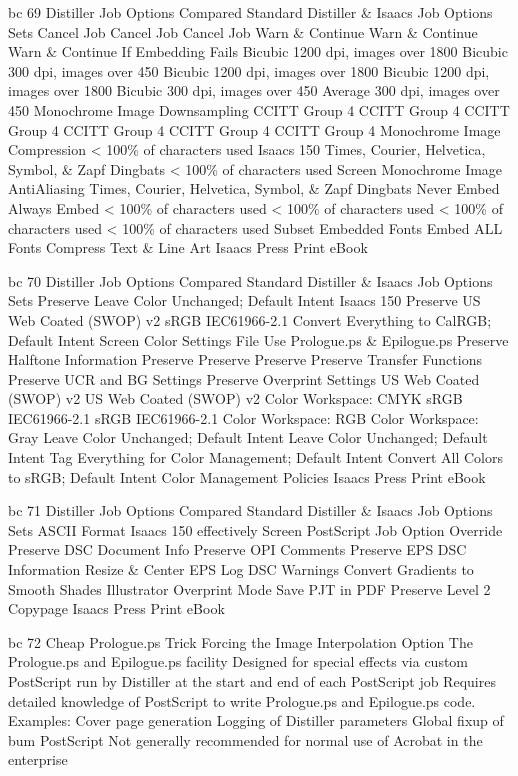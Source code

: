 \documentclass[11pt,a4paper]{article}
\begin{document}
bc 69 Distiller Job Options Compared Standard Distiller \& Isaacs Job Options Sets Cancel Job Cancel Job Cancel Job Warn \& Continue Warn \& Continue Warn \& Continue If Embedding Fails Bicubic 1200 dpi, images over 1800 Bicubic 300 dpi, images over 450 Bicubic 1200 dpi, images over 1800 Bicubic 1200 dpi, images over 1800 Bicubic 300 dpi, images over 450 Average 300 dpi, images over 450 Monochrome Image Downsampling CCITT Group 4 CCITT Group 4 CCITT Group 4 CCITT Group 4 CCITT Group 4 CCITT Group 4 Monochrome Image Compression < 100\% of characters used Isaacs 150 Times, Courier, Helvetica, Symbol, \& Zapf Dingbats < 100\% of characters used Screen Monochrome Image AntiAliasing Times, Courier, Helvetica, Symbol, \& Zapf Dingbats Never Embed Always Embed < 100\% of characters used < 100\% of characters used < 100\% of characters used < 100\% of characters used Subset Embedded Fonts Embed ALL Fonts Compress Text \& Line Art Isaacs Press Print eBook

bc 70 Distiller Job Options Compared Standard Distiller \& Isaacs Job Options Sets Preserve Leave Color Unchanged; Default Intent Isaacs 150 Preserve US Web Coated (SWOP) v2 sRGB IEC61966-2.1 Convert Everything to CalRGB; Default Intent Screen Color Settings File Use Prologue.ps \& Epilogue.ps Preserve Halftone Information Preserve Preserve Preserve Preserve Transfer Functions Preserve UCR and BG Settings Preserve Overprint Settings US Web Coated (SWOP) v2 US Web Coated (SWOP) v2 Color Workspace: CMYK sRGB IEC61966-2.1 sRGB IEC61966-2.1 Color Workspace: RGB Color Workspace: Gray Leave Color Unchanged; Default Intent Leave Color Unchanged; Default Intent Tag Everything for Color Management; Default Intent Convert All Colors to sRGB; Default Intent Color Management Policies Isaacs Press Print eBook

bc 71 Distiller Job Options Compared Standard Distiller \& Isaacs Job Options Sets ASCII Format Isaacs 150 effectively Screen PostScript Job Option Override Preserve DSC Document Info Preserve OPI Comments Preserve EPS DSC Information Resize \& Center EPS Log DSC Warnings Convert Gradients to Smooth Shades Illustrator Overprint Mode Save PJT in PDF Preserve Level 2 Copypage Isaacs Press Print eBook

bc 72 Cheap Prologue.ps Trick Forcing the Image Interpolation Option The Prologue.ps and Epilogue.ps facility Designed for special effects via custom PostScript run by Distiller at the start and end of each PostScript job Requires detailed knowledge of PostScript to write Prologue.ps and Epilogue.ps code. Examples: Cover page generation Logging of Distiller parameters Global fixup of bum PostScript Not generally recommended for normal use of Acrobat in the enterprise
\end{document}

